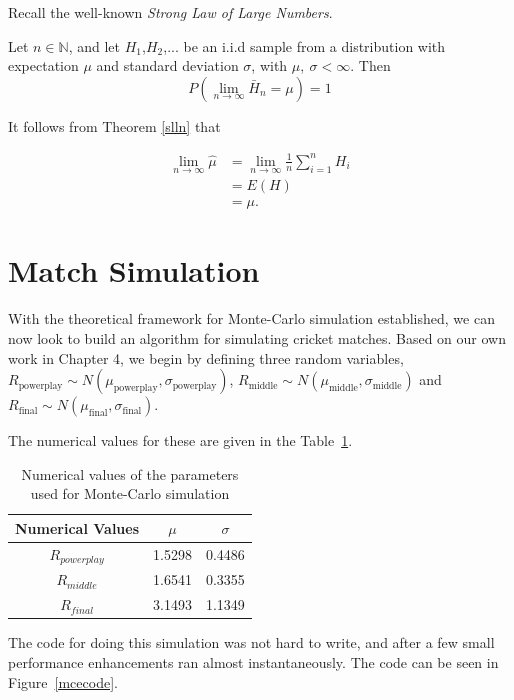 Recall the well-known \textit{Strong Law of Large Numbers}.

\begin{theorem}
    \label{slln}
    Let $n \in \mathbb{N}$, and let $H_1$,$H_2$,... be an i.i.d sample from a distribution with expectation $\mu$ and standard deviation $\sigma$, with $\mu, \ \sigma < \infty$.
    Then 
    $$ 
        P\left( \lim_{n \to \infty} \bar{H}_n = \mu \right) = 1
    $$
\end{theorem}

It follows from Theorem \ref{slln} that

\begin{align}
\lim_{n \to \infty} \hat{\mu} &= \lim_{n \to \infty} \frac{1}{n}\sum_{i=1}^nH_i \\
                              &= E(H) \\
                              &= \mu.
\end{align}

\section{Match Simulation}
\label{matchSim}
With the theoretical framework for Monte-Carlo simulation established, we can now look to build an algorithm for simulating cricket matches. Based on our own work in Chapter 4, 
we begin by defining three random variables, $R_{\text{powerplay}} \sim N(\mu_{\text{powerplay}},\sigma_\text{powerplay})$, $R_{\text{middle}} \sim N(\mu_{\text{middle}},\sigma_{\text{middle}})$
and $R_{\text{final}} \sim N(\mu_{\text{final}},\sigma_{\text{final}})$.

The numerical values for these are given in the Table~\ref{valTable}.

\begin{table}[h]
    \centering
    \begin{tabular}{c | c | c}
        Numerical Values & $\mu$ & $\sigma$ \\
        \hline
        $R_{powerplay}$ & 1.5298 & 0.4486 \\
        $R_{middle}$ & 1.6541 & 0.3355 \\
        $R_{final}$ & 3.1493 & 1.1349 
    \end{tabular}
    \caption{Numerical values of the parameters used for Monte-Carlo simulation}
    \label{valTable}
\end{table}

The code for doing this simulation was not hard to write, and after a few small performance enhancements ran almost instantaneously. The code can be seen in Figure~\ref{mcecode}.

